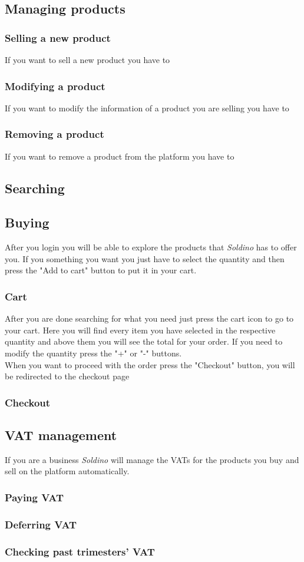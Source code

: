 	\subsection{Managing products}
	\subsubsection{Selling a new product}
	If you want to sell a new product you have to
	
	\subsubsection{Modifying a product}
	If you want to modify the information of a product you are selling you 
	have to 
	\subsubsection{Removing a product}
	If you want to remove a product from the platform you have to
	
	\subsection{Searching}
	\subsection{Buying}
	After you login you will be able to explore the products that 
	\textit{Soldino} has to offer you. If you something you want you
	just have to select the quantity and then press the "Add to cart" button 
	to put it in your cart.
	\subsubsection{Cart}
	After you are done searching for what you need just press the cart icon to
	go to your cart. Here you will find every item you have selected in the 
	respective quantity and above them you will see the total for your order.
	If you need to modify the quantity press the "+" or "-" buttons. \\
	When you want to proceed with the order press the "Checkout" button, 
	you will be redirected to the checkout page
	\subsubsection{Checkout}
	\subsection{VAT management}
	If you are a business \textit{Soldino} will manage the VATs for the products 
	you buy and sell on the platform automatically.
		\subsubsection{Paying VAT}
	
		\subsubsection{Deferring VAT}
		
		\subsubsection{Checking past trimesters' VAT}
		